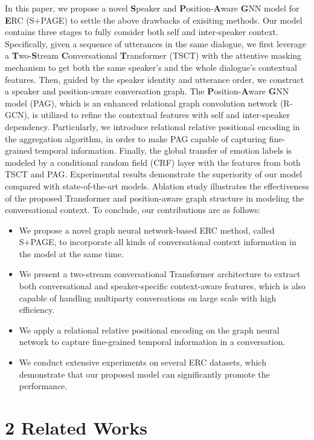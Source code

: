 \documentclass[letterpaper]{article} \usepackage{aaai22}  \usepackage{times}  \usepackage{helvet}  \usepackage{courier}  \usepackage[hyphens]{url}  \usepackage{graphicx} \urlstyle{rm} \def\UrlFont{\rm}  \usepackage{natbib}  \usepackage{caption} \DeclareCaptionStyle{ruled}{labelfont=normalfont,labelsep=colon,strut=off} \frenchspacing  \setlength{\pdfpagewidth}{8.5in}  \setlength{\pdfpageheight}{11in}  \usepackage{algorithm}
\begin{document}
In this paper, we propose a novel \textbf{S}peaker and \textbf{P}osition-\textbf{A}ware \textbf{G}NN model for \textbf{E}RC (S+PAGE) to settle the above drawbacks of exisiting methods. Our model contains three stages to fully consider both self and inter-speaker context.
Specifically, given a sequence of utterances in the same dialogue, we first leverage a \textbf{T}wo-\textbf{S}tream \textbf{C}onversational \textbf{T}ransformer (TSCT) with the attentive masking mechanism to get both the same speaker's and the whole dialogue's contextual features. Then, guided by the speaker identity and utterance order, we construct a speaker and position-aware conversation graph. The  \textbf{P}osition-\textbf{A}ware \textbf{G}NN model (PAG), which is an enhanced relational graph convolution network (R-GCN), is utilized to refine the contextual features with self and inter-speaker dependency. Particularly, we introduce relational relative positional encoding in the aggregation algorithm, in order to make PAG capable of capturing fine-grained temporal information. Finally, the global transfer of emotion labels is modeled by a conditional random field (CRF) layer with the features from both TSCT and PAG. 
Experimental results demonstrate the superiority of our model compared with state-of-the-art models. Ablation study illustrates the effectiveness of the proposed Transformer and position-aware graph structure in modeling the conversational context. To conclude, our contributions are as follows:

\begin{itemize}
    \item We propose a novel graph neural network-based ERC method, called S+PAGE, to incorporate all kinds of conversational context information in the model at the same time.
    \item We present a two-stream conversational Transformer architecture to extract both conversational and speaker-specific context-aware features, which is also capable of handling multiparty conversations on large scale with high efficiency.
    \item We apply a relational relative positional encoding on the graph neural network to capture fine-grained temporal information in a conversation.
    \item We conduct extensive experiments on several ERC datasets, which demonstrate that our proposed model can significantly promote the performance.
\end{itemize}


\section{2 Related Works}
\end{document}

